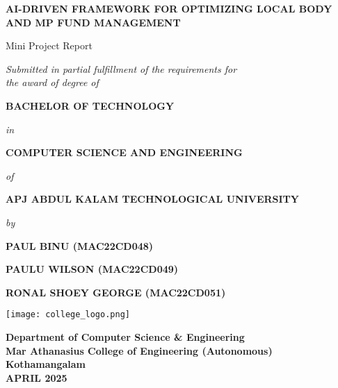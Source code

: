 \documentclass[12pt,a4paper]{report}
\begin{document}
\doublespacing

\begin{center}
    \textbf{\LARGE AI-DRIVEN FRAMEWORK FOR OPTIMIZING LOCAL BODY AND MP FUND MANAGEMENT} \\
    \vspace{12pt}
    
    Mini Project Report \\
    \vspace{12pt}
    
    \textit{Submitted in partial fulfillment of the requirements for \\ the award of degree of} \\
    \vspace{12pt}

    \textbf{BACHELOR OF TECHNOLOGY} \\
    \vspace{8pt}
    
    \textit{in} \\
    \vspace{8pt}
    
    \textbf{COMPUTER SCIENCE AND ENGINEERING} \\
    \vspace{8pt}
    
    \textit{of} \\
    \vspace{8pt}
    
    \textbf{APJ ABDUL KALAM TECHNOLOGICAL UNIVERSITY} \\
    \vspace{8pt}
    
    \textit{by} \\
    \vspace{8pt}

    \textbf{PAUL BINU (MAC22CD048)} \\  
    \vspace{8pt}
    
    \textbf{PAULU WILSON (MAC22CD049)} \\  
    \vspace{8pt}
    
    \textbf{RONAL SHOEY GEORGE (MAC22CD051)} \\  
    \vspace{8pt}

    \texttt{[image: college\_logo.png]}
    \vspace{8pt}

    \textbf{Department of Computer Science \& Engineering \\
    Mar Athanasius College of Engineering (Autonomous)\\
    Kothamangalam} \\
    \vspace{8pt}
    \textbf{APRIL 2025} \\
\thispagestyle{empty}
\end{center}
\end{document}

